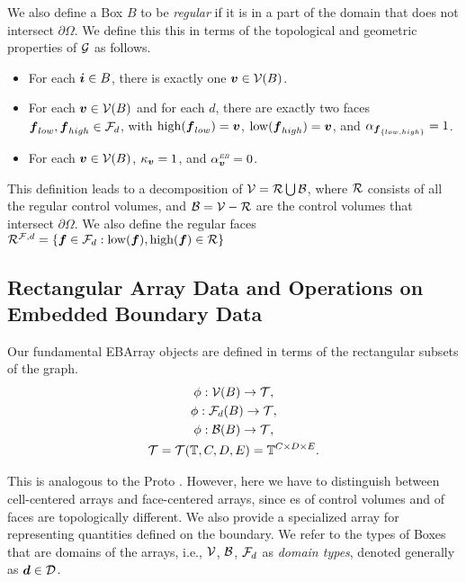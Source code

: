 \documentclass[12pt]{article}
\newcommand{\low}{{\rm{low}}}
\newcommand{\high}{{\rm{high}}}
\newcommand{\vof}{{\mbf{v}}}
\newcommand{\face}{{\mbf{f}}}
\newcommand{\dgen}{{\mbf{d}}}
\newcommand{\ebsub}{{\text{\it \tiny EB}}}
\begin{document}
We also define a Box $B$ to be {\it regular} if it is in a part of the domain that does not intersect $\partial \Omega$. We define this this in terms of the topological and geometric properties of ${\mathcal{G}}$ as follows.
\begin{itemize}
\item
For each ${\boldsymbol{i}} \in B$, there is exactly one $\vof \in \mcl{V}(B)$.
\item
For each $\vof \in \mcl{V}(B)$ and for each $d$, there are exactly two faces 
$\face_{low}, \face_{high} \in \mcl{F}_d$, with $\high(\face_{low}) = \vof$, $\low(\face_{high}) = \vof$, and $\alpha_{\face_{\{low,high\} }} = 1$.
\item
For each $\vof \in \mcl{V}(B)$, $\kappa_\vof = 1$, and $\alpha^\ebsub_\vof = 0$.
\end{itemize}

This definition leads to a decomposition of ${\mathcal{V}} = {\mathcal{R}} \bigcup {\mathcal{B}}$, where ${\mathcal{R}}$ consists of all the regular control volumes, and ${\mathcal{B}} = {\mathcal{V}} - {\mathcal{R}}$ are the control volumes that intersect $\partial \Omega$. We also define the regular faces  $\mcl{R}^{\mcl{F},d} = \{\face \in \mcl{F}_d : \low(\face),\high(\face) \in \mcl{R}\}$

\subsection{Rectangular Array Data and Operations on Embedded Boundary Data}

Our fundamental EBArray objects are defined in terms of the rectangular subsets of the graph.
\begin{gather}
\phi : {\mathcal{V}}(B) \rightarrow {\mathcal{T}} , \nonumber \\
\phi : {\mathcal{F}}_d (B) \rightarrow {\mathcal{T}}, \label{eqn:EBarray} \\
\phi : {\mathcal{B}}(B) \rightarrow {\mathcal{T}}, \nonumber \\
{\mathcal{T}} = {\mathcal{T}}(\mathbb{T},C,D,E) = \mathbb{T}^{C \times D \times E}. \nonumber
\end{gather}

This is analogous to the Proto . However, here we have to distinguish between cell-centered arrays and face-centered arrays, since es of control volumes and of faces are topologically different. We also provide a specialized array for representing quantities defined on the boundary. We refer to the types of Boxes that are domains of the arrays, i.e., ${\mathcal{V}}$, ${\mathcal{B}}$, ${\mathcal{F}}_d$ as {\it domain types},  denoted generally as $\dgen \in \mcl{D}$.
\end{document}
